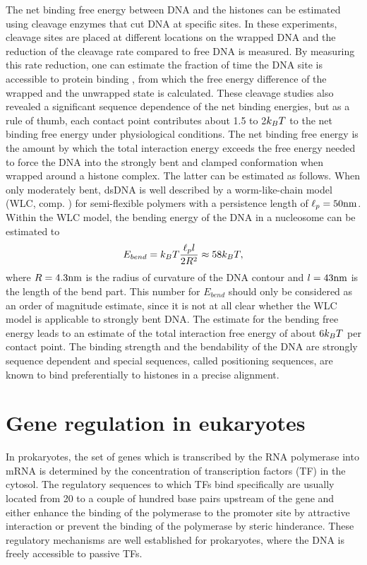 The net binding free energy between DNA and the 
histones can be estimated using cleavage enzymes that cut DNA at specific sites. In these experiments,
cleavage sites are placed at different locations on the wrapped DNA and the reduction of 
the cleavage rate compared to free DNA is measured. By measuring this rate reduction,
one can estimate the fraction of time the DNA site is accessible to protein binding 
\cite{Polach_JMB_95, Polach_JMB_96, Anderson_JMB_00}, from which the free energy difference
of the wrapped and the unwrapped state is calculated. 
These cleavage studies also revealed a significant sequence dependence 
of the net binding energies, but as a rule of thumb, each contact point contributes about
1.5 to 2$k_BT$ to the net binding free energy under physiological conditions. The net binding free energy is the amount 
by which the total interaction energy exceeds the free energy needed to force the DNA into
the strongly bent and clamped conformation when wrapped around a histone complex. 
The latter can be estimated as follows.
When only moderately bent, dsDNA is well described by a worm-like-chain model (WLC, comp. )  for semi-flexible
polymers with a persistence length of ${\ell_p}=50\mathrm{nm}$. Within the WLC model, the bending energy 
of the DNA in a nucleosome can be estimated to 
\begin{equation}
\label{eq:DNA_bending_energy}
E_{bend}=k_BT\frac{{\ell_p} l}{2R^{2}}\approx 58k_BT,
\end{equation}
where $R=4.3\mathrm{nm}$ is the radius of curvature of the DNA contour and  $l=43\mathrm{nm}$ is the length of the bend part.
This number for $E_{bend}$ should only be considered as an order of magnitude estimate, since 
it is not at all clear whether the WLC model is applicable to strongly bent DNA.
The estimate for the bending free energy leads to an estimate of the total interaction free energy of 
about $6k_BT$ per contact point.  The binding strength and the bendability of the DNA are strongly
sequence dependent and special sequences, called positioning sequences, 
are known to bind preferentially to histones in a precise alignment.

\section{Gene regulation in eukaryotes}
In prokaryotes, the set of genes which is transcribed by the RNA polymerase into mRNA 
is determined by the concentration of transcription factors (TF) in the cytosol. 
The regulatory sequences to which TFs bind specifically are usually located
from 20 to a couple of hundred base pairs upstream of the gene and either enhance the 
binding of the polymerase to the promoter site by attractive interaction
or prevent the binding of the polymerase by steric hinderance. 
These regulatory mechanisms are well established for prokaryotes, where the DNA is freely accessible
to passive TFs. 

